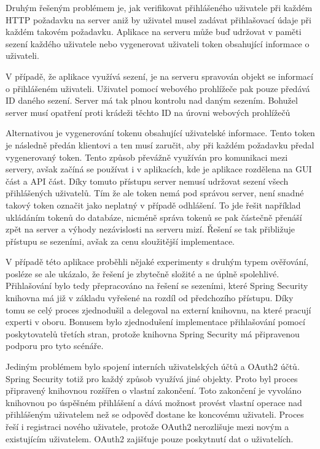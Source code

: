 			Druhým řešeným problémem je, jak verifikovat přihlášeného uživatele při každém \ac{HTTP} požadavku na server
			aniž by uživatel musel zadávat přihlašovací údaje při každém takovém požadavku.
			Aplikace na serveru může buď udržovat v paměti sezení každého uživatele nebo vygenerovat uživateli token
			obsahující informace o uživateli.

			V případě, že aplikace využívá sezení, je na serveru spravován objekt se informací o přihlášeném uživateli.
			Uživatel pomocí webového prohlížeče pak pouze předává ID daného sezení.
			Server má tak plnou kontrolu nad daným sezením.
			Bohužel server musí opatření proti krádeži těchto ID na úrovni webových prohlížečů

			Alternativou je vygenerování tokenu obsahující uživatelské informace.
			Tento token je následně předán klientovi a ten musí zaručit, aby při každém požadavku předal vygenerovaný token.
			Tento způsob převážně využíván pro komunikaci mezi servery, avšak začíná se používat i v aplikacích, kde
			je aplikace rozdělena na \ac{GUI} část a \ac{API} část.
			Díky tomuto přístupu server nemusí udržovat sezení všech přihlášených uživatelů.
			Tím že ale token nemá pod správou server, není snadné takový token označit jako neplatný v případě odhlášení.
			To jde řešit například ukládáním tokenů do databáze, nicméně správa tokenů se pak částečně přenáší zpět
			na server a výhody nezávislosti na serveru mizí.
			Řešení se tak přibližuje přístupu se sezeními, avšak za cenu sloužitější implementace.

			V případě této aplikace proběhli nějaké experimenty s druhým typem ověřování, posléze se ale ukázalo, že
			řešení je zbytečně složité a ne úplně spolehlivé.
			Přihlašování bylo tedy přepracováno na řešení se sezeními, které Spring Security knihovna má již v základu
			vyřešené na rozdíl od předchozího přístupu.
			Díky tomu se celý proces zjednodušil a delegoval na externí knihovnu, na které pracují experti v oboru.
			Bonusem bylo zjednodušení implementace přihlašování pomocí poskytovatelů třetích stran, protože
			knihovna Spring Security má připravenou podporu pro tyto scénáře.

			Jediným problémem bylo spojení interních uživatelských účtů a OAuth2 účtů.
			Spring Security totiž pro každý způsob využívá jiné objekty.
			Proto byl proces připravený knihovnou rozšířen o vlastní zakončení.
			Toto zakončení je vyvoláno knihovnou po úspěšném přihlášení a dává možnost provést vlastní operace nad
			přihlášeným uživatelem než se odpověď dostane ke koncovému uživateli.
			Proces řeší i registraci nového uživatele, protože OAuth2 nerozlišuje mezi novým a existujícím uživatelem.
			OAuth2 zajišťuje pouze poskytnutí dat o uživatelích.


